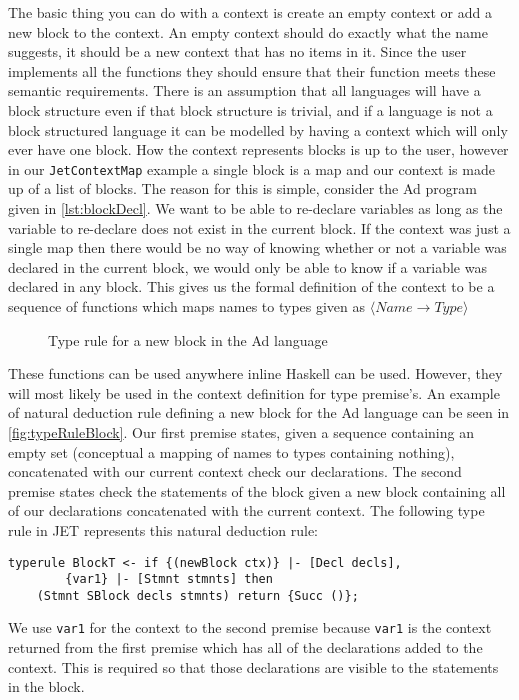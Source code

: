 The basic thing you can do with a context is create an empty context or add a new block to the context.
An empty context should do exactly what the name suggests, it should be a new context that has no items in it.
Since the user implements all the functions they should ensure that their function meets these semantic requirements.
There is an assumption that all languages will have a block structure even if that block structure is trivial, and if a language is not a block structured language it can be modelled by having a context which will only ever have one block.
How the context represents blocks is up to the user, however in our \texttt{JetContextMap} example a single block is a map and our context is made up of a list of blocks.
The reason for this is simple, consider the Ad program given in \autoref{lst:blockDecl}.
We want to be able to re-declare variables as long as the variable to re-declare does not exist in the current block.
If the context was just a single map then there would be no way of knowing whether or not a variable was declared in the current block, we would only be able to know if a variable was declared in any block.
This gives us the formal definition of the context to be a sequence of functions which maps names to types given as $\langle Name \rightarrow Type \rangle$

\begin{figure}[]
    \centering
    \begin{prooftree}
    \end{prooftree}
    \caption{Type rule for a new block in the Ad language}
    \label{fig:typeRuleBlock}
\end{figure}

These functions can be used anywhere inline Haskell can be used.
However, they will most likely be used in the context definition for type premise's.
An example of natural deduction rule defining a new block for the Ad language can be seen in \autoref{fig:typeRuleBlock}.
Our first premise states, given a sequence containing an empty set (conceptual a mapping of names to types containing nothing), concatenated with our current context check our declarations.
The second premise states check the statements of the block given a new block containing all of our declarations concatenated with the current context.
The following type rule in JET represents this natural deduction rule:
\begin{lstlisting}
typerule BlockT <- if {(newBlock ctx)} |- [Decl decls],
        {var1} |- [Stmnt stmnts] then
    (Stmnt SBlock decls stmnts) return {Succ ()};
\end{lstlisting}
We use \texttt{var1} for the context to the second premise because \texttt{var1} is the context returned from the first premise which has all of the declarations added to the context.
This is required so that those declarations are visible to the statements in the block.

